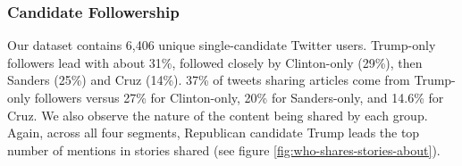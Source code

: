 \documentclass[letterpaper]{article}
\begin{document}


\subsubsection{Candidate Followership}
Our dataset contains 6,406 unique single-candidate Twitter users. Trump-only followers lead with about 31\%, followed closely by Clinton-only (29\%), then Sanders (25\%) and Cruz (14\%). 37\% of tweets sharing articles come from Trump-only followers versus 27\% for Clinton-only, 20\% for Sanders-only, and 14.6\% for Cruz. We also observe the nature of the content being shared by each group. Again, across all four segments, Republican candidate Trump leads the top number of mentions in stories shared (see figure \ref{fig:who-shares-stories-about}).


\end{document}
